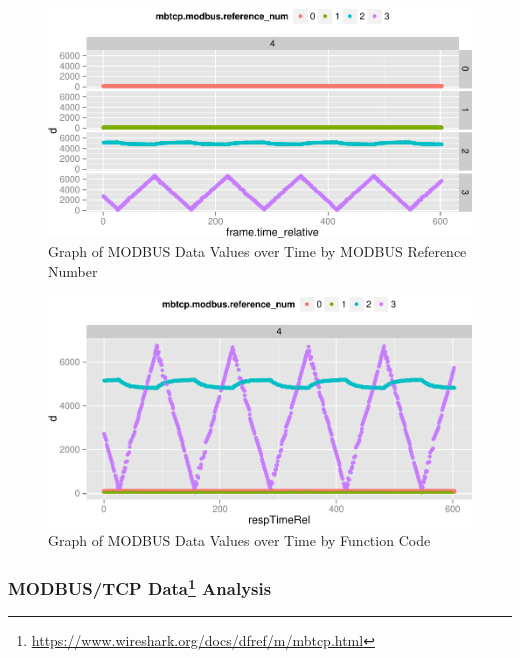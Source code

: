 \documentclass[11pt,]{article}
\begin{document}
\begin{figure}[h]

{\centering \includegraphics{thesis_files/figure-latex/unnamed-chunk-28-1} 

}

\caption{Graph of MODBUS Data Values over Time by MODBUS  Reference Number}\label{fig:unnamed-chunk-28}
\end{figure}

\begin{figure}[h]

{\centering \includegraphics{thesis_files/figure-latex/unnamed-chunk-29-1} 

}

\caption{Graph of MODBUS Data Values over Time by Function Code}\label{fig:unnamed-chunk-29}
\end{figure}

\subsubsection[MODBUS/TCP Data Analysis]{MODBUS/TCP Data\footnote{\url{https://www.wireshark.org/docs/dfref/m/mbtcp.html}}
Analysis}\label{modbustcp-data3-analysis}
\end{document}
